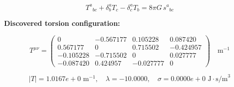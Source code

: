 
\begin{equation}
  T^a{}_{bc} + \delta^a_b T_c - \delta^a_c T_b = 8\pi G \, s^a{}_{bc}
\end{equation}

\textbf{Discovered torsion configuration:}

\begin{equation}
  T^{\mu\nu} = \begin{pmatrix}
    0 & -0.567177 & 0.105228 & 0.087420 \\
    0.567177 & 0 & 0.715502 & -0.424957 \\
    -0.105228 & -0.715502 & 0 & 0.027777 \\
    -0.087420 & 0.424957 & -0.027777 & 0
  \end{pmatrix} \quad \text{m}^{-1}
\end{equation}

\begin{equation}
  |T| = 1.0167e+0 \text{ m}^{-1}, \quad
  \lambda = -10.0000, \quad
  \sigma = 0.0000e+0 \text{ J}\cdot\text{s/m}^3
\end{equation}
